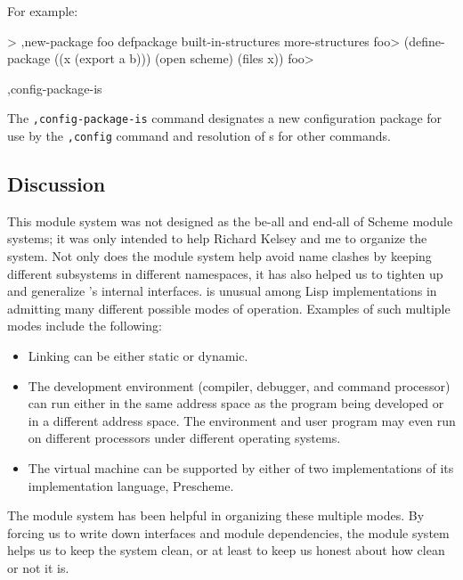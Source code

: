 For example:
\begin{code}
    > ,new-package foo defpackage built-in-structures more-structures
    foo> (define-package ((x (export a b)))
           (open scheme)
	   (files x))
    foo> 
\end{code}


\begin{list}{}{}{}
\item
\begin{code}
,config-package-is 
\end{code}
    The {\tt,config-package-is} command designates a new configuration
    package for use by the {\tt,config} command and resolution of
    s for other commands.
\end{list}




\subsection*{Discussion}

This module system was not designed as the be-all and end-all of
Scheme module systems; it was only intended to help Richard Kelsey and
me to organize the \hack{} system.  Not only does the module system
help avoid name clashes by keeping different subsystems in different
namespaces, it has also helped us to tighten up and generalize
\hack{}'s internal interfaces.  \hack{} is unusual among Lisp
implementations in admitting many different possible modes of
operation.  Examples of such multiple modes include the following:
\begin{itemize}
    \item Linking can be either static or dynamic.

    \item The development environment (compiler, debugger, and command
    processor) can run either in the same address space as the program
    being developed or in a different address space.  The environment and
    user program may even run on different processors under different
    operating systems\cite{Rees-Donald:Program}.

    \item The virtual machine can be supported by either
    of two implementations of its implementation language, Prescheme.
\end{itemize}
The module system has been helpful in organizing these multiple modes.
By forcing us to write down interfaces and module dependencies, the
module system helps us to keep the system clean, or at least to keep
us honest about how clean or not it is.

